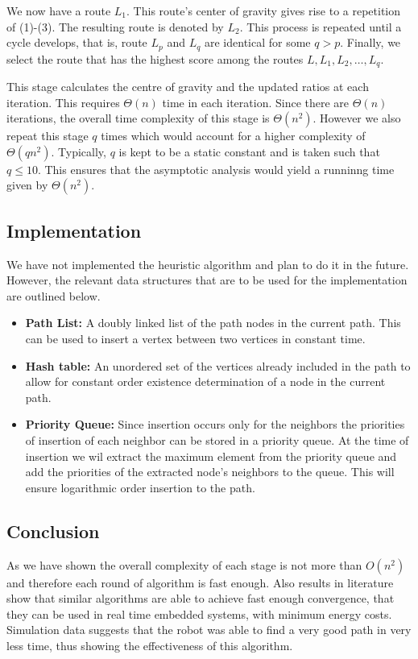 \documentclass{article}
\begin{document}
We now have a route $L_1$. This route’s center of gravity gives rise to a repetition
of (1)-(3). The resulting route is denoted by $L_2$. This process is repeated until
a cycle develops, that is, route $L_p$ and $L_q$ are identical for some $q > p$. Finally,
we select the route that has the highest score among the routes
${L, L_1, L_2 , \ldots , L_q}$. 

This stage calculates the centre of gravity and the updated ratios at each iteration. This requires $\Theta(n)$ time in each iteration. Since there are $\Theta(n)$ iterations, the overall
time complexity of this stage is $\Theta(n^2)$. However we also repeat this stage $q$ times which would account for a higher complexity of $\Theta(qn^2)$. Typically,
$q$ is kept to be a static constant and is taken such that $q \le 10$. This ensures that the asymptotic analysis would yield a runninng time
given by $\Theta(n^2)$.
\subsection{Implementation}

We have not implemented the heuristic algorithm and plan to do it in the future. However, the relevant data structures that are to be used for the implementation are outlined below.

\begin{itemize}
    \item \textbf{Path List: }A doubly linked list of the path nodes in the current path. This can be used to insert a vertex between two vertices in constant time.
    \item \textbf{Hash table: }An unordered set of the vertices already included in the path to allow for constant order existence determination of a node in the current path.
    \item \textbf{Priority Queue: }Since insertion occurs only for the neighbors the priorities of insertion of each neighbor can be stored in a priority queue.
          At the time of insertion we wil extract the maximum element from the priority queue and add the priorities of the extracted node's neighbors to the queue. This will ensure logarithmic order insertion to the path.
\end{itemize}

\subsection{Conclusion}

As we have shown the overall complexity of each stage is not more than $O(n^2)$ and therefore each round of algorithm is fast enough.
Also results in literature show that similar algorithms are able to achieve fast enough convergence, that they can be used in real time embedded systems, with minimum energy costs. \cite{RAMESH1991151}
Simulation data suggests that the robot was able to find a very good path in very less time, thus showing the effectiveness of this algorithm.
\end{document}
